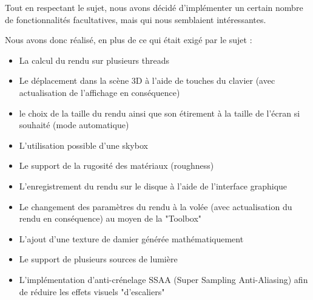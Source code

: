 Tout en respectant le sujet, nous avons décidé d'implémenter un certain nombre de fonctionnalités facultatives, mais qui nous semblaient intéressantes.

Nous avons donc réalisé, en plus de ce qui était exigé par le sujet :
\begin{itemize}
    \item La calcul du rendu sur plusieurs threads
    \item Le déplacement dans la scène 3D à l'aide de touches du clavier (avec actualisation de l'affichage en conséquence)
    \item le choix de la taille du rendu ainsi que son étirement à la taille de l'écran si souhaité (mode automatique)
    \item L'utilisation possible d'une skybox
    \item Le support de la rugosité des matériaux (roughness)
    \item L'enregistrement du rendu sur le disque à l'aide de l'interface graphique
    \item Le changement des paramètres du rendu à la volée (avec actualisation du rendu en conséquence) au moyen de la "Toolbox"
    \item L'ajout d'une texture de damier générée mathématiquement
	\item Le support de plusieurs sources de lumière
	\item L'implémentation d'anti-crénelage SSAA (Super Sampling Anti-Aliasing) afin de réduire les effets visuels "d'escaliers"
\end{itemize}
